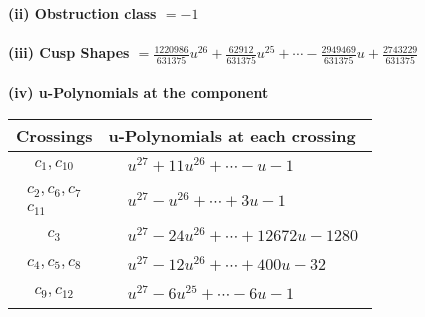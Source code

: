 \documentclass[1p]{elsarticle_modified}
\theoremstyle{definition}
\begin{document}
\flushleft \textbf{(ii) Obstruction class $= -1$}\\~\\
\flushleft \textbf{(iii) Cusp Shapes $= \frac{1220986}{631375} u^{26}+\frac{62912}{631375} u^{25}+\cdots-\frac{2949469}{631375} u+\frac{2743229}{631375}$}\\~\\
\newpage\renewcommand{\arraystretch}{1}
\flushleft \textbf{(iv) u-Polynomials at the component}\newline \\
\begin{tabular}{m{50pt}|m{274pt}}
Crossings & \hspace{64pt}u-Polynomials at each crossing \\
\hline $$\begin{aligned}c_{1},c_{10}\end{aligned}$$&$\begin{aligned}
&u^{27}+11 u^{26}+\cdots- u-1
\end{aligned}$\\
\hline $$\begin{aligned}c_{2},c_{6},c_{7}\\c_{11}\end{aligned}$$&$\begin{aligned}
&u^{27}- u^{26}+\cdots+3 u-1
\end{aligned}$\\
\hline $$\begin{aligned}c_{3}\end{aligned}$$&$\begin{aligned}
&u^{27}-24 u^{26}+\cdots+12672 u-1280
\end{aligned}$\\
\hline $$\begin{aligned}c_{4},c_{5},c_{8}\end{aligned}$$&$\begin{aligned}
&u^{27}-12 u^{26}+\cdots+400 u-32
\end{aligned}$\\
\hline $$\begin{aligned}c_{9},c_{12}\end{aligned}$$&$\begin{aligned}
&u^{27}-6 u^{25}+\cdots-6 u-1
\end{aligned}$\\
\hline
\end{tabular}\\~\\
\newpage\renewcommand{\arraystretch}{1}
\end{document}
